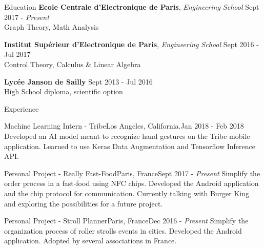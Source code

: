 \documentclass{resume} %
\begin{document}
	
	\begin{rSection}{Education}
		{\bf Ecole Centrale d'Electronique de Paris}, {\em Engineering School} \hfill {Sept 2017 - \em Present}
		\\ Graph Theory, Math Analysis
		
		{\bf Institut Supérieur d'Electronique de Paris}, {\em Engineering School} \hfill {Sept 2016 - Jul 2017}
		\\ Control Theory, Calculus \& Linear Algebra
		
		{\bf Lycée Janson de Sailly} \hfill {Sept 2013 - Jul 2016}
		\\ High School diploma, scientific option
	\end{rSection}
	
	
	
	
	\begin{rSection}{Experience}
		\begin{event}{Machine Learning Intern - Tribe}{Los Angeles, California.}{Jan 2018 - Feb 2018}{
			Developed an AI model meant to recognize hand gestures on the Tribe mobile application. Learned to use Keras Data Augmentation and Tensorflow Inference API. 
		}
		\end{event}
		
		
		
		\begin{event}{Personal Project - Really Fast-Food}{Paris, France}{Sept 2017 - \em Present}{
			Simplify the order process in a fast-food using NFC chips. Developed the Android application and the chip protocol for communication. Currently talking with Burger King and exploring the possibilities for a future project. 
		}
		\end{event}
		
		
		
		\begin{event}{Personal Project - Stroll Planner}{Paris, France}{Dec 2016 - \em Present}{
			Simplify the organization process of roller strolls events in cities. Developed the Android application. Adopted by several associations in France. 
		}
		\end{event}
	\end{rSection}
	
\end{document}
